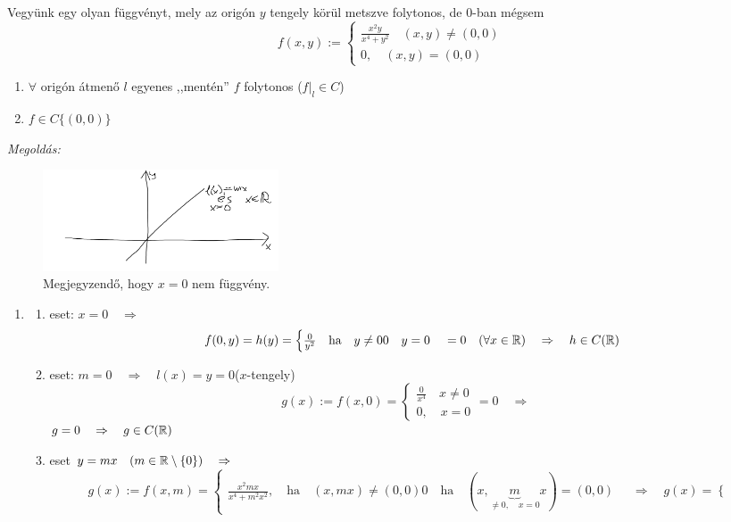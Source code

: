 \documentclass[a4paper,11.5pt]{article}
\begin{document}
	\begin{task}
		Vegyünk egy olyan függvényt, mely az origón $y$ tengely körül metszve folytonos, de 0-ban mégsem
		\[ f(x,y):=\begin{cases}
			\frac{x^2y}{x^4+y^2}\quad (x,y)\not=(0,0)\\
			0,\quad (x,y)=(0,0)
		\end{cases} \]
		\begin{enumerate}
			\item $\forall$ origón átmenő $l$ egyenes ,,mentén'' $f$ folytonos ($f|_l\in C$)
			\item $f\in C\{ (0,0) \}$
		\end{enumerate}
		\textit{Megoldás:}
		\begin{figure}[H]
			\centering
			\includegraphics[height=3cm]{kepek/02.png}
			\caption{Megjegyzendő, hogy $x=0$ nem függvény.}
		\end{figure}
		\begin{enumerate}
			\item\begin{enumerate}
				\item eset: $x=0\quad \Rightarrow\quad $
				\[ f(0,y)=h(y)=\begin{cases}
					\frac{0}{y^2}\quad \text{ha}\quad y\not=0
					0\quad y=0
				\end{cases}=0\quad (\forall x\in\mathbb{R})\quad \Rightarrow\quad h\in C(\mathbb{R}) \]
				\item eset: $m=0\quad \Rightarrow\quad l(x)=y=0$\quad ($x$-tengely)
				\[ g(x):=f(x,0)=\begin{cases}
					\frac{0}{x^4}\quad x\not=0\\
					0,\quad x=0
				\end{cases}=0\quad \Rightarrow\quad  \]
				$g=0\quad \Rightarrow\quad g\in C(\mathbb{R})$
				\item eset $y=mx\quad (m\in\mathbb{R}\setminus\{0\})\quad \Rightarrow$
				\[ g(x):=f(x,m)=\begin{cases}
					\frac{x^2mx}{x^4+m^2x^2},\quad \text{ha}\quad (x,mx)\not=(0,0)
					0\quad \text{ha}\quad (x,\underbrace{m}_{\not=0,\quad x=0}x)=(0,0)
				\end{cases}\quad \Rightarrow\quad g(x)=\begin{cases}

\end{cases}\]
\end{enumerate}
\end{enumerate}
\end{task}
\end{document}
